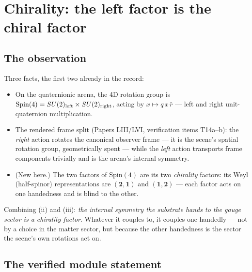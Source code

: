 \documentclass[12pt]{article}
\theoremstyle{definition}
\theoremstyle{remark}
\begin{document}
\section{Chirality: the left factor is the chiral factor}\label{sec:chirality}

\subsection{The observation}

Three facts, the first two already in the record:
\begin{itemize}
\item[(i)] On the quaternionic arena, the 4D rotation group is $\mathrm{Spin}(4) = SU(2)_{\rm left} \times SU(2)_{\rm right}$, acting by $x \mapsto q\,x\,\bar r$ --- left and right unit-quaternion multiplication.
\item[(ii)] The rendered frame split (Papers LIII/LVI, verification items T14a--b): the \emph{right} action rotates the canonical observer frame --- it is the scene's spatial rotation group, geometrically spent --- while the \emph{left} action transports frame components trivially and is the arena's internal symmetry.
\item[(iii)] (New here.) The two factors of $\mathrm{Spin}(4)$ are its two \emph{chirality} factors: its Weyl (half-spinor) representations are $(\mathbf 2, \mathbf 1)$ and $(\mathbf 1, \mathbf 2)$ --- each factor acts on one handedness and is blind to the other.
\end{itemize}

Combining (ii) and (iii): \emph{the internal symmetry the substrate hands to the gauge sector is a chirality factor}. Whatever it couples to, it couples one-handedly --- not by a choice in the matter sector, but because the other handedness is the sector the scene's own rotations act on.

\subsection{The verified module statement}
\end{document}
